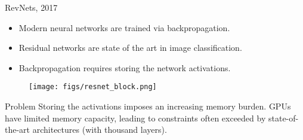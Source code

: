 \begin{frame}{RevNets, 2017}
	\begin{minipage}[t]{0.6\columnwidth}
		\begin{itemize}
			\item Modern neural networks are trained via backpropagation.
			\item Residual networks are state of the art in image classification.
			\item Backpropagation requires storing the network activations.
		\end{itemize}
	\end{minipage}%
	\begin{minipage}[t]{0.4\columnwidth}
		\begin{figure}
			\centering
			\texttt{[image: figs/resnet\_block.png]}
		\end{figure}
	\end{minipage}
	\vspace{0.1cm}
	\begin{block}{Problem}
		Storing the activations imposes an increasing memory burden. GPUs have limited memory capacity, leading to constraints often exceeded by state-of-the-art architectures (with thousand layers).
	\end{block}
\end{frame}
